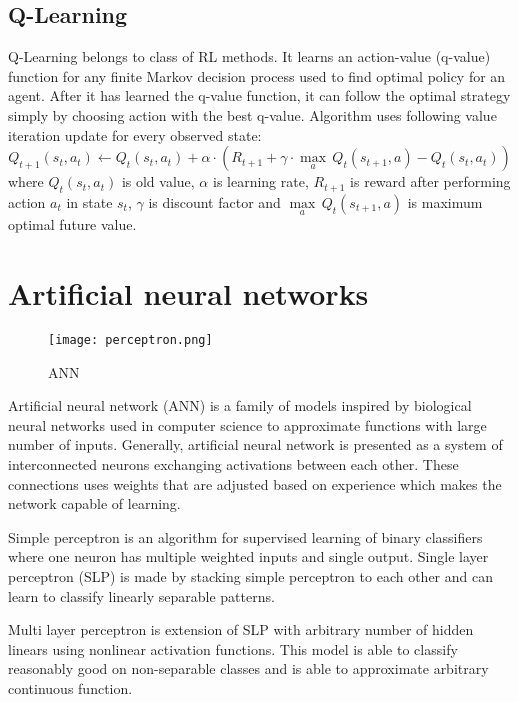 \subsection{Q-Learning}
Q-Learning belongs to class of RL methods. It learns an action-value
(q-value) function for any finite Markov decision process used to find
optimal policy for an agent. After it has learned the q-value function,
it can follow the optimal strategy simply by choosing action with the best
q-value.  Algorithm uses following value iteration update for every observed
state\cite{rlsurvey}:
\begin{equation}
Q_{t+1}(s_t, a_t) \leftarrow Q_t(s_t, a_t) + \alpha \cdot (
    R_{t+1} + \gamma\cdot {\max_a}\,Q_t(s_{t+1}, a) - Q_t(s_t, a_t)
)
\end{equation}
where $Q_t(s_t, a_t)$ is old value, $\alpha$ is learning rate, $R_{t+1}$ is
reward after performing action $a_t$ in state $s_t$, $\gamma$ is discount
factor and $\underset{a}{\max}\,Q_t(s_{t+1}, a)$ is maximum optimal future
value.

\section{Artificial neural networks}
\begin{wrapfigure}{r}{0.4\textwidth}
  \vspace*{-1.85cm}
  \centering
  \texttt{[image: perceptron.png]}
  \vspace*{-0.85cm}
  \caption{ANN}
  \label{fig:network}
  \vspace*{-0.60cm}
\end{wrapfigure}

Artificial neural network (ANN) is a family of models inspired by biological
neural networks used in computer science to approximate functions with
large number of inputs. Generally, artificial neural network is presented
as a system of interconnected neurons exchanging activations between each
other. These connections uses weights that are adjusted based on
experience which makes the network capable of learning.

Simple perceptron is an algorithm for supervised learning of binary classifiers
where one neuron has multiple weighted inputs and single output.
Single layer perceptron (SLP) is made by stacking simple perceptron to each
other and can learn to classify linearly separable patterns.

Multi layer perceptron is extension of SLP with arbitrary number of hidden
linears using nonlinear activation functions. This model is able to classify
reasonably good on non-separable classes and is able to approximate arbitrary
continuous function.



